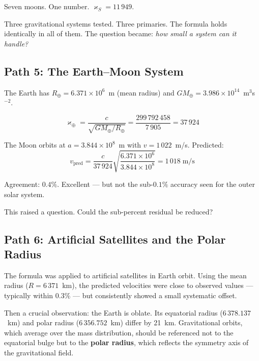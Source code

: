 \documentclass[twocolumn,epjc3]{svjour3}
\newcommand{\kop}{\varkappa}  %
\begin{document}
Seven moons.  One number.  $\kop_S = 11\,949$.

Three gravitational systems tested.  Three primaries.  The formula holds identically in all of them.  The question became: \emph{how small a system can it handle?}


\subsection{Path 5: The Earth--Moon System}
\label{sec:path5}

The Earth has $R_\oplus = 6.371 \times 10^6$~m (mean radius) and $GM_\oplus = 3.986 \times 10^{14}$~m$^3$s$^{-2}$.

\begin{equation}
  \kop_\oplus = \frac{c}{\sqrt{GM_\oplus/R_\oplus}} = \frac{299\,792\,458}{7\,905} = 37\,924
\end{equation}

The Moon orbits at $a = 3.844 \times 10^8$~m with $v = 1\,022$~m/s.  Predicted:
\begin{equation}
  v_{\text{pred}} = \frac{c}{37\,924}\sqrt{\frac{6.371 \times 10^6}{3.844 \times 10^8}} = 1\,018\;\text{m/s}
\end{equation}

Agreement: $0.4\%$.  Excellent --- but not the sub-$0.1\%$ accuracy seen for the outer solar system.

This raised a question.  Could the sub-percent residual be reduced?


\subsection{Path 6: Artificial Satellites and the Polar Radius}
\label{sec:path6}

The formula was applied to artificial satellites in Earth orbit.  Using the mean radius ($R = 6\,371$~km), the predicted velocities were close to observed values --- typically within $0.3\%$ --- but consistently showed a small systematic offset.

Then a crucial observation: the Earth is oblate.  Its equatorial radius ($6\,378.137$~km) and polar radius ($6\,356.752$~km) differ by 21~km.  Gravitational orbits, which average over the mass distribution, should be referenced not to the equatorial bulge but to the \textbf{polar radius}, which reflects the symmetry axis of the gravitational field.
\end{document}
